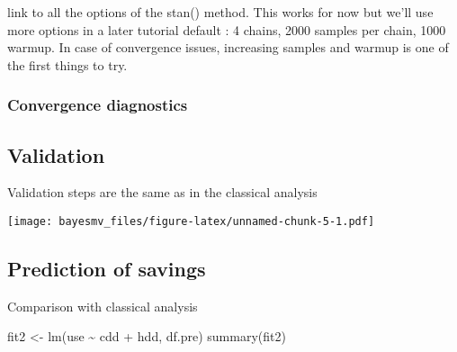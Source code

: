 \documentclass[
]{article}
\newenvironment{Shaded}{\begin{snugshade}}{\end{snugshade}}
\newcommand{\AttributeTok}[1]{\textcolor[rgb]{0.77,0.63,0.00}{#1}}
\newcommand{\ConstantTok}[1]{\textcolor[rgb]{0.00,0.00,0.00}{#1}}
\newcommand{\FunctionTok}[1]{\textcolor[rgb]{0.00,0.00,0.00}{#1}}
\newcommand{\NormalTok}[1]{#1}
\newcommand{\OtherTok}[1]{\textcolor[rgb]{0.56,0.35,0.01}{#1}}
\newcommand{\SpecialCharTok}[1]{\textcolor[rgb]{0.00,0.00,0.00}{#1}}
\begin{document}
link to all the options of the stan() method. This works for now but we'll use more options in a later tutorial
default : 4 chains, 2000 samples per chain, 1000 warmup. In case of convergence issues, increasing samples and warmup is one of the first things to try.

\hypertarget{convergence-diagnostics}{%
\subsubsection{Convergence diagnostics}\label{convergence-diagnostics}}

\hypertarget{validation}{%
\subsection{Validation}\label{validation}}

Validation steps are the same as in the classical analysis

\begin{Shaded}
\end{Shaded}

\texttt{[image: bayesmv\_files/figure-latex/unnamed-chunk-5-1.pdf]}

\hypertarget{prediction-of-savings}{%
\subsection{Prediction of savings}\label{prediction-of-savings}}

Comparison with classical analysis

\begin{Shaded}
\begin{Highlighting}[]
\NormalTok{fit2 }\OtherTok{\textless{}{-}} \FunctionTok{lm}\NormalTok{(use }\SpecialCharTok{\textasciitilde{}}\NormalTok{ cdd }\SpecialCharTok{+}\NormalTok{ hdd, df.pre)}
\FunctionTok{summary}\NormalTok{(fit2)}
\end{Highlighting}
\end{Shaded}
\end{document}
